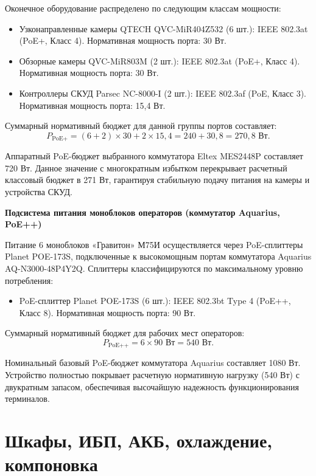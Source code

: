 \documentclass{bmstu}
\begin{document}
Оконечное оборудование распределено по следующим классам мощности:
\begin{itemize}
    \item Узконаправленные камеры QTECH QVC-MiR404Z532 (6 шт.): IEEE 802.3at (PoE+, Класс 4). Нормативная мощность порта: 30 Вт.
    \item Обзорные камеры QVC-MiR803M (2 шт.): IEEE 802.3at (PoE+, Класс 4). Нормативная мощность порта: 30 Вт.
    \item Контроллеры СКУД Parsec NC-8000-I (2 шт.): IEEE 802.3af (PoE, Класс 3). Нормативная мощность порта: 15,4 Вт.
\end{itemize}

Суммарный нормативный бюджет для данной группы портов составляет:
\begin{equation}
    P_{\text{PoE+}} = (6 + 2) \times 30 + 2 \times 15{,}4 = 240 + 30{,}8 = 270{,}8 \text{ Вт}.
\end{equation}

Аппаратный PoE-бюджет выбранного коммутатора Eltex MES2448P составляет 720 Вт. Данное значение с многократным избытком перекрывает расчетный классовый бюджет в 271 Вт, гарантируя стабильную подачу питания на камеры и устройства СКУД.

\textbf{Подсистема питания моноблоков операторов (коммутатор Aquarius, PoE++)}

Питание 6 моноблоков «Гравитон» М75И осуществляется через PoE-сплиттеры Planet POE-173S, подключенные к высокомощным портам коммутатора Aquarius AQ-N3000-48P4Y2Q. Сплиттеры классифицируются по максимальному уровню потребления:
\begin{itemize}
    \item PoE-сплиттер Planet POE-173S (6 шт.): IEEE 802.3bt Type 4 (PoE++, Класс 8). Нормативная мощность порта: 90 Вт.
\end{itemize}

Суммарный нормативный бюджет для рабочих мест операторов:
\begin{equation}
    P_{\text{PoE++}} = 6 \times 90 \text{ Вт} = 540 \text{ Вт}.
\end{equation}

Номинальный базовый PoE-бюджет коммутатора Aquarius составляет 1080 Вт. Устройство полностью покрывает расчетную нормативную нагрузку (540 Вт) с двукратным запасом, обеспечивая высочайшую надежность функционирования терминалов.

\chapter{Шкафы, ИБП, АКБ, охлаждение, компоновка}
\end{document}
